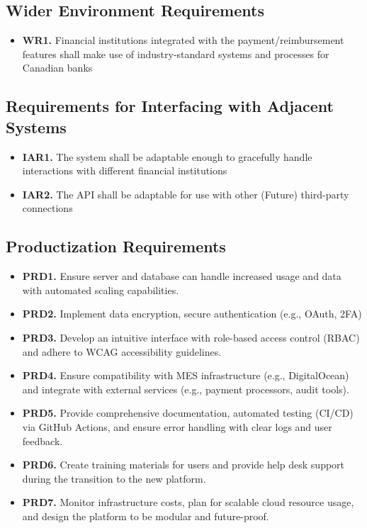 \documentclass[12pt]{article}
\begin{document}
\subsection{Wider Environment Requirements}
\begin{itemize}
    \item \textbf{WR1.} Financial institutions integrated with the payment/reimbursement features shall make use of industry-standard systems and processes for Canadian banks
\end{itemize}

\subsection{Requirements for Interfacing with Adjacent Systems}
\begin{itemize}
    \item \textbf{IAR1.} The system shall be adaptable enough to gracefully handle interactions with different financial institutions
    \item \textbf{IAR2.} The API shall be adaptable for use with other (Future) third-party connections
\end{itemize}

\subsection{Productization Requirements}
\begin{itemize}
    \item \textbf{PRD1. } Ensure server and database can handle increased usage and data with automated scaling capabilities.
    \item \textbf{PRD2. } Implement data encryption, secure authentication (e.g., OAuth, 2FA)
    \item \textbf{PRD3. }Develop an intuitive interface with role-based access control (RBAC) and adhere to WCAG accessibility guidelines.
    \item \textbf{PRD4. } Ensure compatibility with MES infrastructure (e.g., DigitalOcean) and integrate with external services (e.g., payment processors, audit tools).
    \item \textbf{PRD5. } Provide comprehensive documentation, automated testing (CI/CD) via GitHub Actions, and ensure error handling with clear logs and user feedback.
    \item \textbf{PRD6. } Create training materials for users and provide help desk support during the transition to the new platform.
    \item \textbf{PRD7. } Monitor infrastructure costs, plan for scalable cloud resource usage, and design the platform to be modular and future-proof.
\end{itemize}
\end{document}
